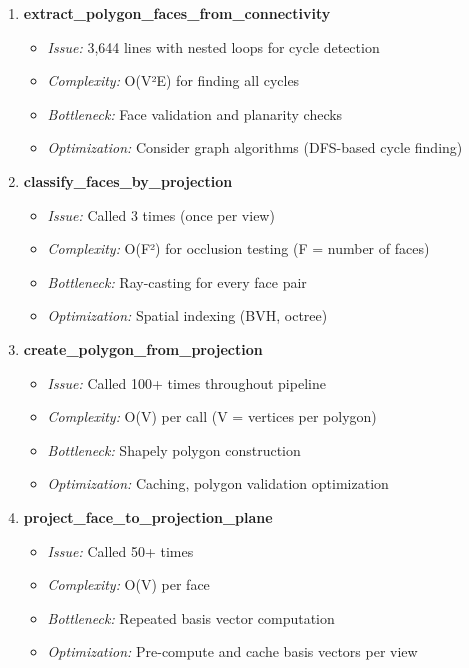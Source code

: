 \documentclass[11pt,a4paper]{article}
\begin{document}
\begin{enumerate}
    \item \textbf{extract\_polygon\_faces\_from\_connectivity}
    \begin{itemize}
        \item \textit{Issue:} 3,644 lines with nested loops for cycle detection
        \item \textit{Complexity:} O(V²E) for finding all cycles
        \item \textit{Bottleneck:} Face validation and planarity checks
        \item \textit{Optimization:} Consider graph algorithms (DFS-based cycle finding)
    \end{itemize}
    
    \item \textbf{classify\_faces\_by\_projection}
    \begin{itemize}
        \item \textit{Issue:} Called 3 times (once per view)
        \item \textit{Complexity:} O(F²) for occlusion testing (F = number of faces)
        \item \textit{Bottleneck:} Ray-casting for every face pair
        \item \textit{Optimization:} Spatial indexing (BVH, octree)
    \end{itemize}
    
    \item \textbf{create\_polygon\_from\_projection}
    \begin{itemize}
        \item \textit{Issue:} Called 100+ times throughout pipeline
        \item \textit{Complexity:} O(V) per call (V = vertices per polygon)
        \item \textit{Bottleneck:} Shapely polygon construction
        \item \textit{Optimization:} Caching, polygon validation optimization
    \end{itemize}
    
    \item \textbf{project\_face\_to\_projection\_plane}
    \begin{itemize}
        \item \textit{Issue:} Called 50+ times
        \item \textit{Complexity:} O(V) per face
        \item \textit{Bottleneck:} Repeated basis vector computation
        \item \textit{Optimization:} Pre-compute and cache basis vectors per view
    \end{itemize}
\end{enumerate}
\end{document}
